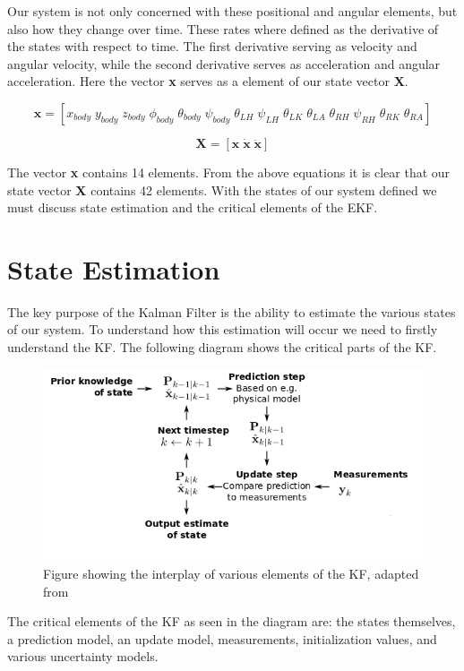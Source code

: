 \newpage
Our system is not only concerned with these positional and angular elements, but also how they change over time. These rates where defined as the derivative of the states with respect to time. The first derivative serving as velocity and angular velocity, while the second derivative serves as acceleration and angular acceleration. Here the vector \textbf{x} serves as a element of our state vector \textbf{X}.

$$\textbf{x} = [ x_{body} \; y_{body} \; z_{body} \; \phi_{body} \;    		    \theta_{body}  \; \psi_{body}\;  \theta_{LH}\; \psi_{LH}   \;\theta_{LK} 	\;\theta_{LA} 	\;\theta_{RH} \;\psi_{RH}   	\;\theta_{RK}   \; \theta_{RA}  		]$$ 

$$	\textbf{X}=[\textbf{x} \; \dot{\textbf{x}} \; \ddot{\textbf{x}}] $$

The vector \textbf{x} contains 14 elements. From the above equations it is clear that our state vector \textbf{X} contains 42 elements. With the states of our system defined we must discuss state estimation and the critical elements of the EKF.

\section{State Estimation}
The key purpose of the Kalman Filter is the ability to estimate the various states of our system. To understand how this estimation will occur we need to firstly understand the KF. The following diagram shows the critical parts of the KF.

\begin{figure}[!ht] 
\captionsetup{width=0.8\linewidth, font=small}  
\includegraphics[width=0.6\linewidth]{figures/kf.png}
\caption{Figure showing the interplay of various elements of the KF, adapted from \cite{kfkfkf}}
\label{fig:kf}
\end{figure}

The critical elements of the KF as seen in the diagram are: the states themselves, a prediction model, an update model, measurements, initialization values, and various uncertainty models. 


